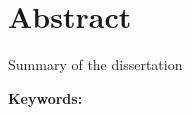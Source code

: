 %
\chapter*{Abstract}
\label{sec:Abstract}%
%

Summary of the dissertation 

\vspace{1cm}

\textbf{Keywords:} \keywords


